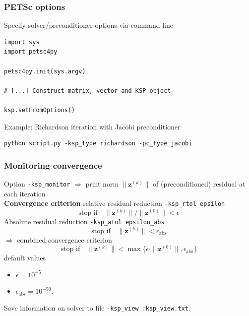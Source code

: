\documentclass{beamer}
\begin{document}

\begin{frame}[fragile]
  \frametitle{PETSc options}
  Specify solver/preconditioner options via command line
  \begin{lstlisting}
import sys
import petsc4py

petsc4py.init(sys.argv)    

# [...] Construct matrix, vector and KSP object

ksp.setFromOptions()
  \end{lstlisting}
Example: Richardson iteration with Jacobi preconditioner
\begin{verbatim}
python script.py -ksp_type richardson -pc_type jacobi
  \end{verbatim}
\end{frame}


\begin{frame}[fragile]
  \frametitle{Monitoring convergence}
  Option \lstinline{-ksp_monitor} $\Rightarrow$ print norm $\|\boldsymbol{z}^{(k)}\|$ of (preconditioned) residual at each iteration\\
  \textbf{Convergence criterion} relative residual reduction \lstinline{-ksp_rtol epsilon}
  $$
  \text{stop if}\quad\|\boldsymbol{z}^{(k)}\|/\|\boldsymbol{z}^{(0)}\|<\epsilon
  $$
  Absolute residual reduction \lstinline{-ksp_atol epsilon_abs}
  $$
  \text{stop if}\quad \|\boldsymbol{z}^{(k)}\|<\epsilon_{\text{abs}}
  $$ 
  $\Rightarrow$ combined convergence criterion
  $$
  \text{stop if}\quad 
  \|\boldsymbol{z}^{(k)}\|<\operatorname{max}\{\epsilon\cdot \|\boldsymbol{z}^{(0)}\|,\epsilon_{\operatorname{abs}}\}$$
  default values
  \begin{itemize}
    \item $\epsilon=10^{-5}$
    \item $\epsilon_{\text{abs}}=10^{-50}$.
  \end{itemize}

Save information on solver to file \lstinline{-ksp_view :ksp_view.txt}. 
\end{frame}

\end{document}

